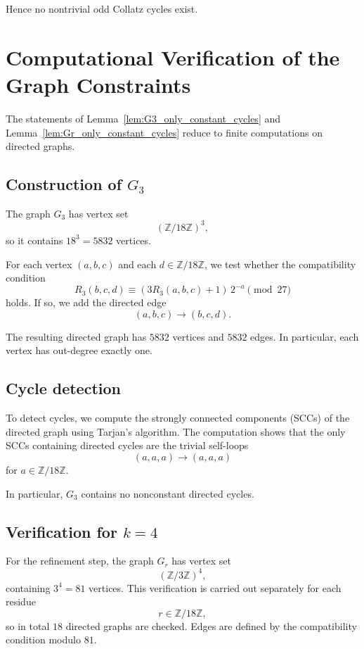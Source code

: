 \documentclass[11pt]{article}
\theoremstyle{definition}
\theoremstyle{plain}
\theoremstyle{remark}
\begin{document}
Hence no nontrivial odd Collatz cycles exist.

\appendix
\renewcommand{\thesection}{Appendix \Alph{section}}
\renewcommand{\thesubsection}{\Alph{section}.\arabic{subsection}}

\section{Computational Verification of the Graph Constraints}\label{app:computation}

The statements of Lemma~\ref{lem:G3_only_constant_cycles}
and Lemma~\ref{lem:Gr_only_constant_cycles} reduce to finite
computations on directed graphs.
\subsection{Construction of $G_3$}
The graph $G_3$ has vertex set
\[
(\mathbb{Z}/18\mathbb{Z})^3,
\]
so it contains $18^3=5832$ vertices.

For each vertex $(a,b,c)$ and each $d\in\mathbb{Z}/18\mathbb{Z}$,
we test whether the compatibility condition
\[
R_3(b,c,d)
\equiv
(3R_3(a,b,c)+1)\,2^{-a}
\pmod{27}
\]
holds. If so, we add the directed edge
\[
(a,b,c)\rightarrow(b,c,d).
\]

The resulting directed graph has $5832$ vertices and $5832$ edges.
In particular, each vertex has out-degree exactly one.

\subsection{Cycle detection}

To detect cycles, we compute the strongly connected components (SCCs)
of the directed graph using Tarjan's algorithm.
The computation shows that the only SCCs containing directed cycles
are the trivial self-loops
\[
(a,a,a)\to(a,a,a)
\]
for $a\in\mathbb{Z}/18\mathbb{Z}$.

In particular, $G_3$ contains no nonconstant directed cycles.

\subsection{Verification for $k=4$}

For the refinement step, the graph $G_r$ has vertex set
\[
(\mathbb{Z}/3\mathbb{Z})^4,
\]
containing $3^4=81$ vertices.
This verification is carried out separately for each residue
\[
r\in\mathbb{Z}/18\mathbb{Z},
\]
so in total $18$ directed graphs are checked.
Edges are defined by the compatibility condition modulo $81$.
\end{document}
